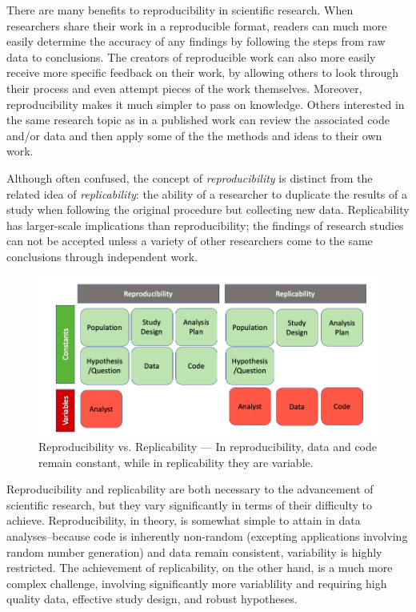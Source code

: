 \documentclass[12pt,twoside]{reedthesis}
\begin{document}
There are many benefits to reproducibility in scientific research. When researchers share their work in a reproducible format, readers can much more easily determine the accuracy of any findings by following the steps from raw data to conclusions. The creators of reproducible work can also more easily receive more specific feedback on their work, by allowing others to look through their process and even attempt pieces of the work themselves. Moreover, reproducibility makes it much simpler to pass on knowledge. Others interested in the same research topic as in a published work can review the associated code and/or data and then apply some of the the methods and ideas to their own work.

Although often confused, the concept of \emph{reproducibility} is distinct from the related idea of \emph{replicability}: the ability of a researcher to duplicate the results of a study when following the original procedure but collecting new data. Replicability has larger-scale implications than reproducibility; the findings of research studies can not be accepted unless a variety of other researchers come to the same conclusions through independent work.
\begin{figure}

{\centering \includegraphics[width=1\linewidth]{figure/versus} 

}

\caption{Reproducibility vs. Replicability --- In reproducibility, data and code remain constant, while in replicability they are variable.}\label{fig:unnamed-chunk-3}
\end{figure}
Reproducibility and replicability are both necessary to the advancement of scientific research, but they vary significantly in terms of their difficulty to achieve. Reproducibility, in theory, is somewhat simple to attain in data analyses--because code is inherently non-random (excepting applications involving random number generation) and data remain consistent, variability is highly restricted. The achievement of replicability, on the other hand, is a much more complex challenge, involving significantly more variablility and requiring high quality data, effective study design, and robust hypotheses.
\end{document}
